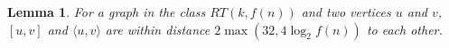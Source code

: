\documentclass[11pt]{article}
\newtheorem{lem}{Lemma}
\begin{document}




\begin{lem} \label{lem:loglocal}
For a graph in the class $RT(k,f(n))$ and two
	vertices $u$ and $v$, $[u,v]$ and $\langle u,v\rangle$ 
	are within distance $2\max(32,4\log_2 f(n))$ to each other.
\end{lem}
\end{document}
